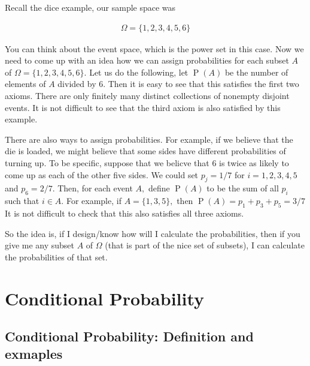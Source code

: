 \documentclass[ 11pt,%
				a4paper,%
				oneside,%
				headinclude,%
				footinclude = true,%
				cleardoublepage = empty,%
				reqno]{scrbook}
\begin{document}
\begin{example}

Recall the dice example, our sample space was 

\begin{align*}
\Omega=\{1,2,3,4,5,6\}
\end{align*}

You can think about the event space, which is the power set in this case. Now we need to come up with an idea how we can assign probabilities for each subset $A$ of $\Omega=\{1,2,3,4,5,6\}$. Let us do the following, let $\operatorname{P}(A)$ be the number of elements of $A$ divided by $6$. Then it is easy to see that this satisfies the first two axioms. There are only finitely many distinct collections of nonempty disjoint events. It is not difficult to see that the third axiom is also satisfied by this example.


There are also ways to assign probabilities. For example, if we believe that the die is loaded, we might believe that some sides have different probabilities of turning up. To be specific, suppose that we belicve that 6 is twice as likely to come up as each of the other five sides. We could set $p_{j}=1 / 7$ for $i=1,2,3,4,5$ and $p_{6}=2 / 7 .$ Then, for each event $A,$ define $\operatorname{P}(A)$ to be the sum of all $p_{i}$ such that $i \in A .$ For example, if $A=\{1,3,5\},$ then $\operatorname{P}(A)=p_{1}+p_{3}+p_{5}=3 / 7$ It is not difficult to check that this also satisfies all three axioms.

So the idea is, if I design/know how will I calculate the probabilities, then if you give me any subset $A$ of $\Omega$ (that is part of the nice set of subsets), I can calculate the probabilities of that set. 
	
\end{example}

\chapter{Conditional Probability}


\section{Conditional Probability: Definition and exmaples}
\end{document}

